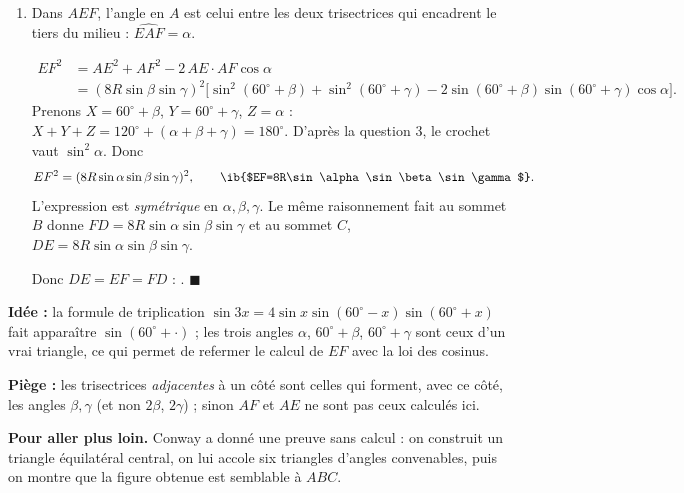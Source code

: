 \begin{enumerate}[itemsep=14pt]
  \emph{(Autre preuve, sans triangle :)} $Z=180^\circ-(X+Y)$ donc $\cos Z=-\cos(X+Y)$ et $\sin Z=\sin(X+Y)$ ; on développe $\sin^2(X+Y)$ et on compare.

  \item Dans $AEF$, l'angle en $A$ est celui entre les deux trisectrices qui encadrent le tiers du milieu : $\widehat{EAF}=\alpha$.

  \[\begin{aligned}EF^2&=AE^2+AF^2-2\,AE\cdot AF\cos\alpha\\ &=(8R\sin\beta\sin\gamma)^2\Big[\sin^2(60^\circ+\beta)+\sin^2(60^\circ+\gamma)-2\sin(60^\circ+\beta)\sin(60^\circ+\gamma)\cos\alpha\Big].\end{aligned}\]
  Prenons $X=60^\circ+\beta$, $Y=60^\circ+\gamma$, $Z=\alpha$ : $X+Y+Z=120^\circ+(\alpha+\beta+\gamma)=180^\circ$. D'après la question 3, le crochet vaut $\sin^2\alpha$. Donc
  \[EF^2=(8R\sin\alpha\sin\beta\sin\gamma)^2,\qquad\ib{$EF=8R\sin\alpha\sin\beta\sin\gamma$}.\]
  L'expression est \emph{symétrique} en $\alpha,\beta,\gamma$. Le même raisonnement fait au sommet $B$ donne $FD=8R\sin\alpha\sin\beta\sin\gamma$ et au sommet $C$, $DE=8R\sin\alpha\sin\beta\sin\gamma$.

  Donc $DE=EF=FD$ : . $\blacksquare$
\end{enumerate}

\textbf{Idée :} la formule de triplication $\sin3x=4\sin x\sin(60^\circ-x)\sin(60^\circ+x)$ fait apparaître $\sin(60^\circ+\cdot)$ ; les trois angles $\alpha$, $60^\circ+\beta$, $60^\circ+\gamma$ sont ceux d'un vrai triangle, ce qui permet de refermer le calcul de $EF$ avec la loi des cosinus.

\textbf{Piège :} les trisectrices \emph{adjacentes} à un côté sont celles qui forment, avec ce côté, les angles $\beta,\gamma$ (et non $2\beta$, $2\gamma$) ; sinon $AF$ et $AE$ ne sont pas ceux calculés ici.

\textbf{Pour aller plus loin.} Conway a donné une preuve sans calcul : on construit un triangle équilatéral central, on lui accole six triangles d'angles convenables, puis on montre que la figure obtenue est semblable à $ABC$.

